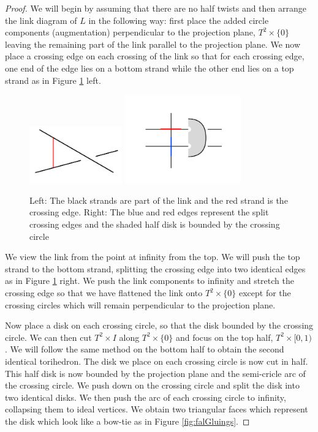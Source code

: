 \documentclass[11pt]{amsart}
\theoremstyle{plain}
\theoremstyle{definition}
\begin{document}
\begin{proof}
We will begin by assuming that there are no half twists and then
arrange the link diagram of $L$ in the following way: first place the added
circle components (augmentation) perpendicular to the projection plane, $T^2
\times \{0\}$ leaving the remaining part of the link parallel to the projection
plane.  We now place a crossing edge on each crossing of the link so that for
each crossing edge, one end of the edge lies on a bottom strand while the other
end lies on a top strand as in Figure \ref{fig:crossingArc} left.

\begin{figure} \centering \includegraphics[width=4cm]{crossingArc}
\includegraphics[width=5cm]{crossingPush} \caption{Left: The black strands are
part of the link and the red strand is the crossing edge. Right: The blue and
red edges represent the split crossing edges and the shaded half disk is bounded
by the crossing circle} \label{fig:crossingArc} \end{figure}

\indent We view the link from the point at infinity from the top. We will push
the top strand to the bottom strand, splitting the crossing edge into two
identical edges as in Figure \ref{fig:crossingArc} right. We push the link
components to infinity and stretch the crossing edge so that we have flattened
the link onto $T^2 \times \{0\}$ except for the crossing circles which will
remain perpendicular to the projection plane. 
 
\indent Now place a disk on each crossing circle, so that the disk bounded by
the crossing circle. We can then cut $T^2 \times I$ along $T^2 \times \{0\}$ and
focus on the top half, $T^2 \times [0,1)$. We will follow the same method on the
bottom half to obtain the second identical torihedron. The disk we place on each
crossing circle is now cut in half. This half disk is now bounded by the
projection plane and the semi-cricle arc of the crossing circle. We push down on
the crossing circle and split the disk into two identical disks. We then push
the arc of each crossing circle to infinity, collapsing them to ideal vertices.
We obtain two triangular faces which represent the disk which look like a
bow-tie as in Figure \ref{fig:falGluings}. 


\end{proof}
\end{document}
